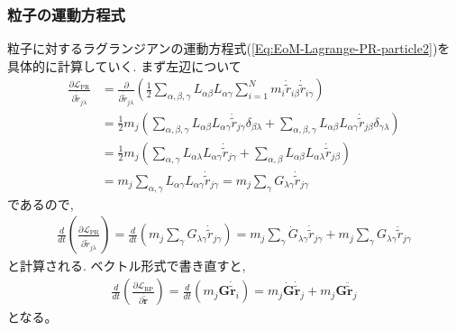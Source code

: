 \subsubsection{粒子の運動方程式}
粒子に対するラグランジアンの運動方程式(\ref{Eq:EoM-Lagrange-PR-particle2})を具体的に計算していく.
まず左辺について
\begin{align}
  \frac{\partial \mathcal{L}_{\mathrm{PR}}}
       {\partial \dot{\tilde{r}}_{j \lambda}}
  &=
  \frac{\partial}{\partial \dot{\tilde{r}}_{j \lambda}}
  \left(
    \frac{1}{2}
    \sum_{\alpha,\beta,\gamma}
    L_{\alpha\beta} L_{\alpha\gamma}
    \sum_{i=1}^{N} m_{i}
    \dot{\tilde{r}}_{i\beta} \dot{\tilde{r}}_{i\gamma}
  \right)
  \\
  &=
  \frac{1}{2} m_{j}
  \left(
      \sum_{\alpha,\beta,\gamma}
      L_{\alpha\beta} L_{\alpha\gamma}
      \dot{\tilde{r}}_{j\gamma} \delta_{\beta \lambda}
      +
      \sum_{\alpha,\beta,\gamma}
      L_{\alpha\beta} L_{\alpha\gamma}
      \dot{\tilde{r}}_{j\beta} \delta_{\gamma \lambda}
  \right)
  \\
  &=
  \frac{1}{2} m_{j}
  \left(
      \sum_{\alpha,\gamma}
      L_{\alpha\lambda} L_{\alpha\gamma}
      \dot{\tilde{r}}_{j\gamma}
      +
      \sum_{\alpha,\beta}
      L_{\alpha\beta} L_{\alpha\lambda}
      \dot{\tilde{r}}_{j\beta}
  \right)
  \\
  &=
  m_{j}
  \sum_{\alpha,\gamma}
  L_{\alpha\gamma} L_{\alpha\gamma} \dot{\tilde{r}}_{j \gamma}
  =
  m_{j}
  \sum_{\gamma}
  G_{\lambda\gamma}\dot{\tilde{r}}_{j \gamma}
\end{align}
であるので,
\begin{align}
  \frac{d}{dt}
  \left(
    \frac{\partial \mathcal{L}_{\mathrm{PR}}}
         {\partial \dot{\tilde{r}}_{j \lambda}}
  \right)
  =
  \frac{d}{dt}
  \left(
    m_{j}
    \sum_{\gamma}
    G_{\lambda\gamma}\dot{\tilde{r}}_{j \gamma}
  \right)
  =
  m_{j}
  \sum_{\gamma}
  \dot{G}_{\lambda\gamma}\dot{\tilde{r}}_{j \gamma}
  +
  m_{j}
  \sum_{\gamma}
  G_{\lambda\gamma} \ddot{\tilde{r}}_{j \gamma}
\end{align}
と計算される. ベクトル形式で書き直すと,
\begin{align}
  \frac{d}{dt}
  \left(
    \frac{\partial \mathcal{L}_{\mathrm{RP}}}{\partial \dot{\tilde{\bm{r}}}}
  \right)
  =
  \frac{d}{dt}
  \left(
    m_{j} \bm{G} \dot{\tilde{\bm{r}}}_{i}
  \right)
  =
  m_{j} \dot{\bm{G}} \dot{\tilde{\bm{r}}}_{j}
  +
  m_{j} \bm{G} \ddot{\tilde{\bm{r}}}_{j}
  \label{Eq:EoM-PR-particle-left}
\end{align}
となる。

